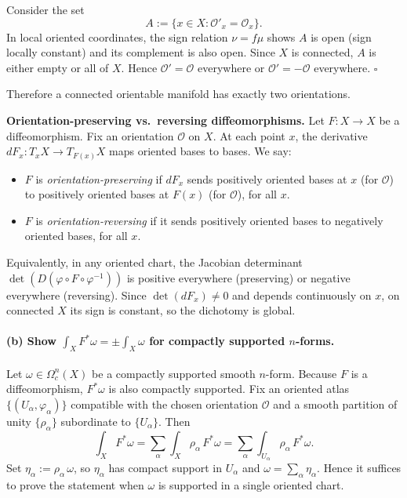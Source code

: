 \documentclass[12pt,a4paper]{article}
\theoremstyle{plain}
\theoremstyle{definition}      %
\begin{document}
	Consider the set
	\[
	A := \{x\in X : \mathcal O'_x = \mathcal O_x\}.
	\]
	In local oriented coordinates, the sign relation $\nu = f\mu$ shows $A$ is open (sign locally constant) and its
	complement is also open. Since $X$ is connected, $A$ is either empty or all of $X$.
	Hence $\mathcal O'=\mathcal O$ everywhere or $\mathcal O'=-\mathcal O$ everywhere.
	\hfill$\square$
	
	\medskip
	\noindent
	Therefore a connected orientable manifold has exactly two orientations.
	
	\medskip
	\noindent
	\textbf{Orientation-preserving vs.\ reversing diffeomorphisms.}
	Let $F:X\to X$ be a diffeomorphism. Fix an orientation $\mathcal O$ on $X$.
	At each point $x$, the derivative $dF_x:T_xX\to T_{F(x)}X$ maps oriented bases to bases.
	We say:
	\begin{itemize}
		\item $F$ is \emph{orientation-preserving} if $dF_x$ sends positively oriented bases at $x$ (for $\mathcal O$)
		to positively oriented bases at $F(x)$ (for $\mathcal O$), for all $x$.
		\item $F$ is \emph{orientation-reversing} if it sends positively oriented bases to negatively oriented bases, for all $x$.
	\end{itemize}
	Equivalently, in any oriented chart, the Jacobian determinant $\det(D(\varphi\circ F\circ\varphi^{-1}))$
	is positive everywhere (preserving) or negative everywhere (reversing).
	Since $\det(dF_x)\neq 0$ and depends continuously on $x$, on connected $X$ its sign is constant, so the dichotomy is global.
	
	\medskip
	\paragraph{(b) Show $\displaystyle \int_X F^*\omega=\pm\int_X\omega$ for compactly supported $n$-forms.}
	
	\noindent
	Let $\omega\in\Omega_c^n(X)$ be a compactly supported smooth $n$-form.
	Because $F$ is a diffeomorphism, $F^*\omega$ is also compactly supported.
	Fix an oriented atlas $\{(U_\alpha,\varphi_\alpha)\}$ compatible with the chosen orientation $\mathcal O$ and
	a smooth partition of unity $\{\rho_\alpha\}$ subordinate to $\{U_\alpha\}$.
	Then
	\[
	\int_X F^*\omega = \sum_\alpha \int_X \rho_\alpha\,F^*\omega
	= \sum_\alpha \int_{U_\alpha} \rho_\alpha\,F^*\omega.
	\]
	Set $\eta_\alpha := \rho_\alpha\,\omega$, so $\eta_\alpha$ has compact support in $U_\alpha$ and
	$\omega=\sum_\alpha \eta_\alpha$.
	Hence it suffices to prove the statement when $\omega$ is supported in a single oriented chart.
	
\end{document}
